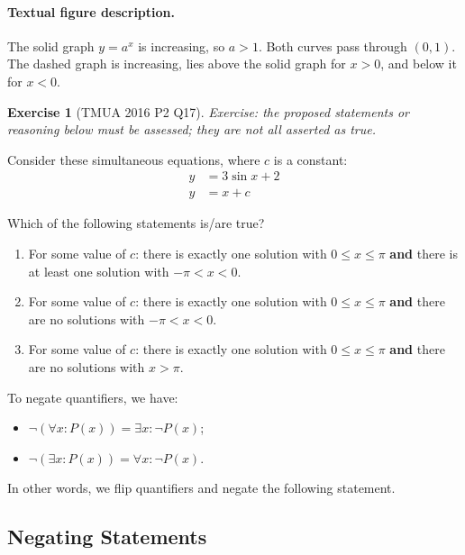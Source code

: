 \documentclass[11pt]{article}
\theoremstyle{definition}
\newtheorem{example}[theorem]{Exercise}
\theoremstyle{remark}
\newcommand{\pqty}[1]{\left(#1\right)}
\begin{document}
\paragraph{Textual figure description.}\label{fig:tmua-2017-p2-q7}
The solid graph \(y=a^x\) is increasing, so \(a>1\). Both curves pass through \((0,1)\). The dashed graph is increasing, lies above the solid graph for \(x>0\), and below it for \(x<0\).


\begin{example}[TMUA 2016 P2 Q17]\label{tmua-6-unit-013}
\textit{Exercise: the proposed statements or reasoning below must be assessed; they are not all asserted as true.}\par

    Consider these simultaneous equations, where \(c\) is a constant:
    \begin{align*}
        y &= 3 \sin x + 2 \\
        y &= x + c
    \end{align*}

    Which of the following statements is/are true?

    \begin{enumerate}[label=\Roman*.]
        \item For some value of \(c\): there is exactly one solution with \(0 \leq x \leq \pi\) \textbf{and} there is at least one solution with \(-\pi < x < 0\).
        \item For some value of \(c\): there is exactly one solution with \(0 \leq x \leq \pi\) \textbf{and} there are no solutions with \(-\pi < x < 0\).
        \item For some value of \(c\): there is exactly one solution with \(0 \leq x \leq \pi\) \textbf{and} there are no solutions with \(x > \pi\).
    \end{enumerate}
\end{example}

To negate quantifiers, we have:
\begin{itemize}
    \item \(\lnot \pqty{\forall x: P\pqty{x}} = \exists x: \lnot P\pqty{x}\);
    \item \(\lnot \pqty{\exists x: P\pqty{x}} = \forall x: \lnot P\pqty{x}\).
\end{itemize}

In other words, we flip quantifiers and negate the following statement.

\subsection{Negating Statements}\label{tmua-6-subsection-006}
\end{document}
